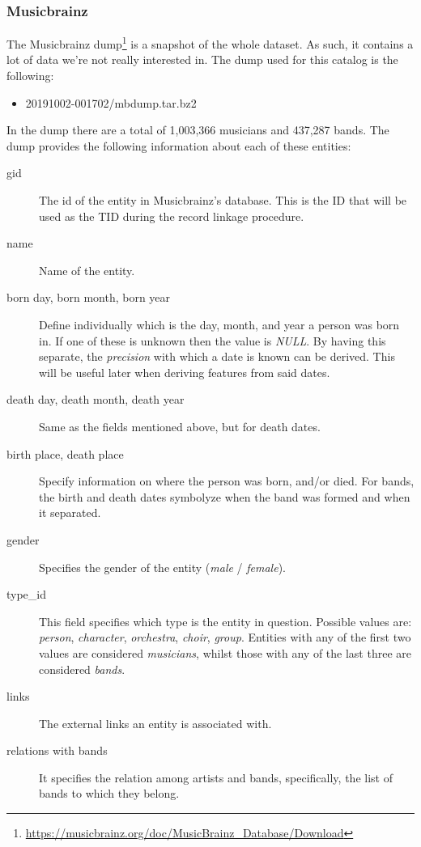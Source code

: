 \documentclass[epsfig,a4paper,11pt,titlepage,twoside,openany]{book}
\newcommand{\footurl}[1]{\footnote{\url{#1}}}
\begin{document}
\subsubsection{Musicbrainz}
\label{sec:shape-musicbrainz}

The Musicbrainz dump\footurl{https://musicbrainz.org/doc/MusicBrainz_Database/Download} is a snapshot of the whole dataset. As such, it contains a lot of data we're not really interested in. The dump used for this catalog is the following:

\begin{itemize}
    \item 20191002-001702/mbdump.tar.bz2
\end{itemize}

In the dump there are a total of 1,003,366 musicians and 437,287 bands. The dump provides the following information about each of these entities:

\begin{description}
\item[gid] The id of the entity in Musicbrainz's database. This is the ID that will be used as the TID during the record linkage procedure. 

\item[name] Name of the entity.

\item[born day, born month, born year] Define individually which is the day, month, and year a person was born in. If one of these is unknown then the value is \textit{NULL}. By having this separate, the \textit{precision} with which a date is known can be derived. This will be useful later when deriving features from said dates. 

\item[death day, death month, death year] Same as the fields mentioned above, but for death dates.

\item[birth place, death place] Specify information on where the person was born, and/or died. For bands, the birth and death dates symbolyze when the band was formed and when it separated.

\item[gender] Specifies the gender of the entity (\textit{male} / \textit{female}).

\item[type\_id] This field specifies which type is the entity in question. Possible values are: \textit{person}, \textit{character}, \textit{orchestra}, \textit{choir}, \textit{group}. Entities with any of the first two values are considered \textit{musicians}, whilst those with any of the last three are considered \textit{bands}.

\item[links] The external links an entity is associated with.

\item[relations with bands] It specifies the relation among artists and bands, specifically, the list of bands to which they belong. 
\end{description}
\end{document}
